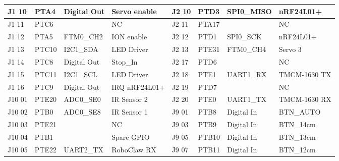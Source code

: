 \begin{table}[H]
\begin{tabular}{|r|r|r|r|l|l|r|l|}
		\hline
		\multicolumn{1}{|l|}{J1 10} & \multicolumn{1}{l|}{PTA4 } & \multicolumn{1}{l|}{Digital Out} & \multicolumn{1}{l|}{Servo enable} & J2 10 & PTD3  & \multicolumn{1}{l|}{SPI0\_MISO} & nRF24L01+ \\
		\hline
		\multicolumn{1}{|l|}{J1 11} & \multicolumn{1}{l|}{PTC6} &       & \multicolumn{1}{l|}{NC} & J2 11 & PTA17  &       & NC \\
		\hline
		\multicolumn{1}{|l|}{J1 12} & \multicolumn{1}{l|}{PTA5 } & \multicolumn{1}{l|}{FTM0\_CH2} & \multicolumn{1}{l|}{ION enable} & J2 12 & PTD1  & \multicolumn{1}{l|}{SPI0\_SCK} & nRF24L01+ \\
		\hline
		\multicolumn{1}{|l|}{J1 13} & \multicolumn{1}{l|}{PTC10} & \multicolumn{1}{l|}{I2C1\_SDA} & \multicolumn{1}{l|}{LED Driver} & J2 13 & PTE31 & \multicolumn{1}{l|}{FTM0\_CH4} & Servo 3 \\
		\hline
		\multicolumn{1}{|l|}{J1 14} & \multicolumn{1}{l|}{PTC8 } & \multicolumn{1}{l|}{Digital Out} & \multicolumn{1}{l|}{Stop\_In} & J2 17 & PTD6  &       & NC \\
		\hline
		\multicolumn{1}{|l|}{J1 15} & \multicolumn{1}{l|}{PTC11} & \multicolumn{1}{l|}{I2C1\_SCL } & \multicolumn{1}{l|}{LED Driver} & J2 18 & PTE1  & \multicolumn{1}{l|}{UART1\_RX} & TMCM-1630 TX \\
		\hline
		\multicolumn{1}{|l|}{J1 16} & \multicolumn{1}{l|}{PTC9 } & \multicolumn{1}{l|}{Digital Out} & \multicolumn{1}{l|}{IRQ nRF24L01+} & J2 19 & PTD7  &       & NC \\
		\hline
		\multicolumn{1}{|l|}{J10 01} & \multicolumn{1}{l|}{PTE20} & \multicolumn{1}{l|}{ADC0\_SE0} & \multicolumn{1}{l|}{IR Sensor 2} & J2 20 & PTE0  & \multicolumn{1}{l|}{UART1\_TX } & TMCM-1630 RX \\
		\hline
		\multicolumn{1}{|l|}{J10 02} & \multicolumn{1}{l|}{PTB0 } & \multicolumn{1}{l|}{ADC0\_SE8} & \multicolumn{1}{l|}{IR Sensor 1} & J9 01 & PTB8  & \multicolumn{1}{l|}{Digital In} & BTN\_AUTO \\
		\hline
		\multicolumn{1}{|l|}{J10 03} & \multicolumn{1}{l|}{PTE21} &       & \multicolumn{1}{l|}{NC} & J9 03 & PTB9  & \multicolumn{1}{l|}{Digital In} & BTN\_14cm \\
		\hline
		\multicolumn{1}{|l|}{J10 04} & \multicolumn{1}{l|}{PTB1 } &       & \multicolumn{1}{l|}{Spare GPIO} & J9 05 & PTB10 & \multicolumn{1}{l|}{Digital In} & BTN\_13cm \\
		\hline
		\multicolumn{1}{|l|}{J10 05} & \multicolumn{1}{l|}{PTE22 } & \multicolumn{1}{l|}{UART2\_TX} & \multicolumn{1}{l|}{RoboClaw RX} & J9 07 & PTB11 & \multicolumn{1}{l|}{Digital In} & BTN\_12cm \\

\end{tabular}
\end{table}
